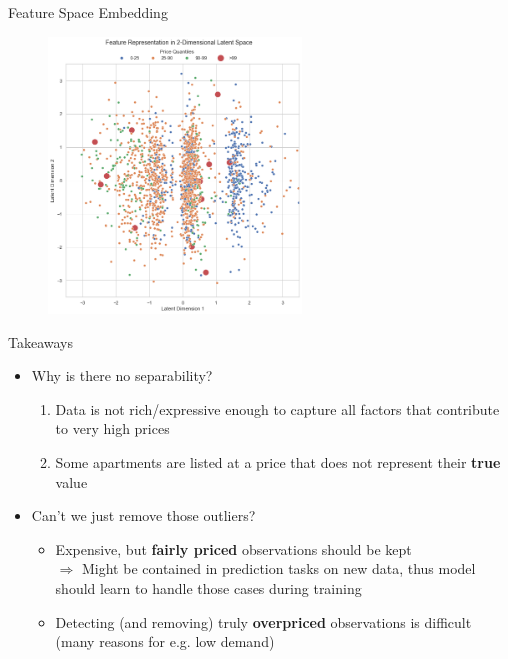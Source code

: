 \documentclass[ngerman,inputenc]{beamer}
\begin{document}
\begin{frame}{Feature Space Embedding}
  \begin{figure}[t]
    \centering
    \includegraphics[width=0.6\textwidth]{latent_representation.png}
    \label{fig:latent-representation}
  \end{figure}
\end{frame}

\begin{frame}{Takeaways}
  \begin{itemize}
    \item Why is there no separability?
          \begin{enumerate}
            \item Data is not rich/expressive enough to capture all factors that contribute to very high prices
            \item Some apartments are listed at a price that does not represent their \textbf{true} value
          \end{enumerate}
          \pause
    \item Can't we just remove those outliers?
          \begin{itemize}
            \item Expensive, but \textbf{fairly priced} observations should be kept \\
                  $\Rightarrow$ Might be contained in prediction tasks on new data, thus model should learn to handle those cases during training
            \item Detecting (and removing) truly \textbf{overpriced} observations is difficult (many reasons for e.g. low demand)
          \end{itemize}
  \end{itemize}
\end{frame}
\end{document}
